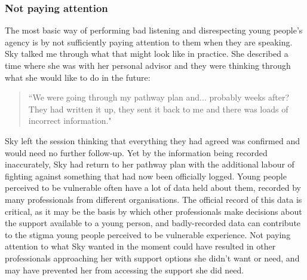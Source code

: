 \subsubsection{Not paying attention}
The most basic way of performing bad listening and disrespecting young people's agency is by not sufficiently paying attention to them when they are speaking. Sky talked me through what that might look like in practice. She described a time where she was with her personal advisor and they were thinking through what she would like to do in the future:
\begin{quote}
“We were going through my pathway plan and... probably weeks after? They had written it up, they sent it back to me and there was loads of incorrect information."
\end{quote}
Sky left the session thinking that everything they had agreed was confirmed and would need no further follow-up. Yet by the information being recorded inaccurately, Sky had return to her pathway plan with the additional labour of fighting against something that had now been officially logged. Young people perceived to be vulnerable often have a lot of data held about them, recorded by many professionals from different organisations. The official record of this data is critical, as it may be the basis by which other professionals make decisions about the support available to a young person, and badly-recorded data can contribute to the stigma young people perceived to be vulnerable experience. Not paying attention to what Sky wanted in the moment could have resulted in other professionals approaching her with support options she didn't want or need, and may have prevented her from accessing the support she did need.

